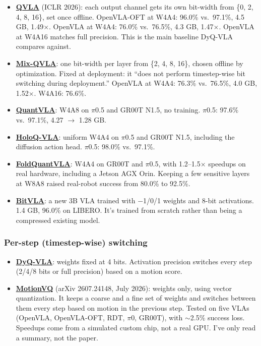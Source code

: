 \documentclass[11pt]{article}
\begin{document}
\begin{itemize}
\item \textbf{\href{https://arxiv.org/abs/2602.03782}{QVLA}} (ICLR 2026): each output channel gets its own bit-width from \{0, 2, 4, 8, 16\}, set once offline. OpenVLA-OFT at W4A4: 96.0\% vs.~97.1\%, 4.5 GB, 1.49$\times$. OpenVLA at W4A4: 76.0\% vs.~76.5\%, 4.3 GB, 1.47$\times$. OpenVLA at W4A16 matches full precision. This is the main baseline DyQ-VLA compares against.
\item \textbf{\href{https://arxiv.org/abs/2606.19565}{Mix-QVLA}}: one bit-width per layer from \{2, 4, 8, 16\}, chosen offline by optimization. Fixed at deployment: it ``does not perform timestep-wise bit switching during deployment.'' OpenVLA at W4A4: 76.3\% vs.~76.5\%, 4.0 GB, 1.52$\times$. W4A16: 76.6\%.
\item \textbf{\href{https://arxiv.org/abs/2602.20309}{QuantVLA}}: W4A8 on $\pi$0.5 and GR00T N1.5, no training. $\pi$0.5: 97.6\% vs.~97.1\%, 4.27 $\rightarrow$ 1.28 GB.
\item \textbf{\href{https://arxiv.org/abs/2605.28803}{HoloQ-VLA}}: uniform W4A4 on $\pi$0.5 and GR00T N1.5, including the diffusion action head. $\pi$0.5: 98.0\% vs.~97.1\%.
\item \textbf{\href{https://arxiv.org/abs/2609.24433v1}{FoldQuantVLA}}: W4A4 on GR00T and $\pi$0.5, with 1.2--1.5$\times$ speedups on real hardware, including a Jetson AGX Orin. Keeping a few sensitive layers at W8A8 raised real-robot success from 80.0\% to 92.5\%.
\item \textbf{\href{https://arxiv.org/abs/2506.07530}{BitVLA}}: a new 3B VLA trained with $-$1/0/1 weights and 8-bit activations. 1.4 GB, 96.0\% on LIBERO. It's trained from scratch rather than being a compressed existing model.
\end{itemize}

\subsubsection{Per-step (timestep-wise) switching}\label{per-step-timestep-wise-switching}

\begin{itemize}
\item \textbf{\href{https://arxiv.org/pdf/2603.07904}{DyQ-VLA}}: weights fixed at 4 bits. Activation precision switches every step (2/4/8 bits or full precision) based on a motion score.
\item \textbf{\href{https://pith.science/paper/2607.24148}{MotionVQ}} (arXiv 2607.24148, July 2026): weights only, using vector quantization. It keeps a coarse and a fine set of weights and switches between them every step based on motion in the previous step. Tested on five VLAs (OpenVLA, OpenVLA-OFT, RDT, $\pi$0, GR00T), with $\sim$2.5\% success loss. Speedups come from a simulated custom chip, not a real GPU. I've only read a summary, not the paper.
\end{itemize}
\end{document}
